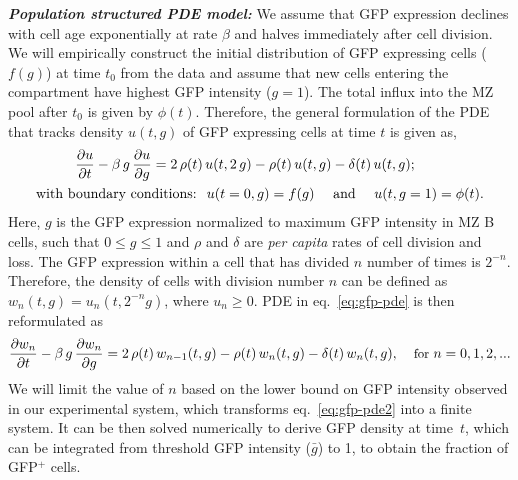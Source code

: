 \documentclass[11pt]{article}
\begin{document}
\textbf{\textit{Population structured PDE model:}}
We assume that GFP expression declines with cell age exponentially at rate $\beta$ and halves immediately after cell division.
We will empirically construct the initial distribution of GFP expressing cells ($f(g)$) at time $t_{0}$ from the data and
assume that new cells entering the compartment have highest GFP intensity ($g=1$).
The total influx into the MZ pool after $t_0$ is given by $\phi(t)$.
Therefore, the general formulation of the PDE that tracks density $u(t, g)$  of GFP expressing cells at time $t$ is given as,
\begin{equation}
\begin{aligned}
\small
\frac{\partial u}{\partial t}  - \beta \,g \, \frac{\partial u}{\partial g} = 2\,  \rho(t) & \, u(t, 2\,g) - \rho(t) \, u(t, g) - \delta(t)  \, u(t, g); 
\\
\text{with boundary conditions: }& \;  u(t=0, g) = f(g) \quad \text{ and } \quad u(t, g=1) = \phi(t).
\label{eq:gfp-pde}
\end{aligned}
\end{equation}
Here, $g$ is the GFP expression normalized to maximum GFP intensity in MZ B cells, such that $0 \le g \le 1$ and $\rho$ and $\delta$ are \textit{per capita} rates of cell division and loss.
The GFP expression within a cell that has divided $n$ number of times is $2^{-n}$. 
Therefore, the density of cells with division number $n$ can be defined as $w_{n}(t, g) = u_{n}(t, 2^{-n} g)$, where $u_{n} \ge 0$. %
PDE in eq.~\ref{eq:gfp-pde} is then reformulated as
\begin{equation} 
\small
\frac{\partial w_{n}}{\partial t}  - \beta \,g \, \frac{\partial w_{n}}{\partial g} = 2\, \rho(t)  \, w_{n-1}(t, g) - \rho(t) \, w_{n}(t, g)  - \delta(t)  \, w_{n}(t, g), \quad \, \text{for } n = 0, 1, 2, ...
\label{eq:gfp-pde2}
\end{equation}
We will limit the value of $n$ based on the lower bound on GFP intensity observed in our experimental system, which transforms {eq.~\ref{eq:gfp-pde2}} into a finite system.
It can be then solved numerically to derive GFP density at time~$t$, which can be integrated from threshold GFP intensity ($\bar{g}$) to 1, to obtain the fraction of GFP$^{+}$ cells. 
\end{document}
